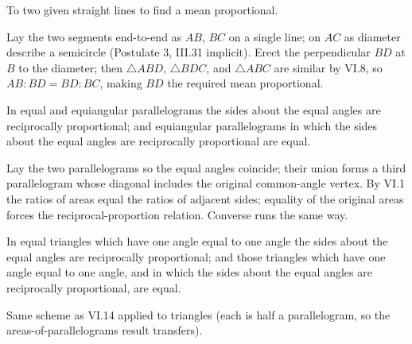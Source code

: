 \begin{claim}
\label{prop:VI.13}
To two given straight lines to find a mean proportional.
\end{claim}
\begin{evidence}[Proof of VI.13]
\label{ev:VI.13}
Lay the two segments end-to-end as $AB$, $BC$ on a single line; on
$AC$ as diameter describe a semicircle (Postulate 3, III.31 implicit).
Erect the perpendicular $BD$ at $B$ to the diameter; then $\triangle
ABD$, $\triangle BDC$, and $\triangle ABC$ are similar by VI.8, so
$AB : BD = BD : BC$, making $BD$ the required mean proportional.
\end{evidence}

\begin{claim}
\label{prop:VI.14}
In equal and equiangular parallelograms the sides about the equal
angles are reciprocally proportional; and equiangular parallelograms
in which the sides about the equal angles are reciprocally
proportional are equal.
\end{claim}
\begin{evidence}[Proof of VI.14]
\label{ev:VI.14}
Lay the two parallelograms so the equal angles coincide; their union
forms a third parallelogram whose diagonal includes the original
common-angle vertex.  By VI.1 the ratios of areas equal the ratios of
adjacent sides; equality of the original areas forces the
reciprocal-proportion relation.  Converse runs the same way.
\end{evidence}

\begin{claim}
\label{prop:VI.15}
In equal triangles which have one angle equal to one angle the sides
about the equal angles are reciprocally proportional; and those
triangles which have one angle equal to one angle, and in which the
sides about the equal angles are reciprocally proportional, are equal.
\end{claim}
\begin{evidence}[Proof of VI.15]
\label{ev:VI.15}
Same scheme as VI.14 applied to triangles (each is half a
parallelogram, so the areas-of-parallelograms result transfers).
\end{evidence}

